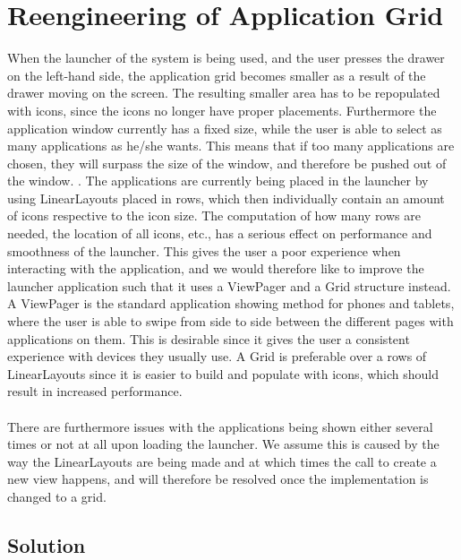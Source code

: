 
\section{Reengineering of Application Grid}
\label{sec:reengineering_of_application_grid}

When the launcher of the \giraf system is being used, and the user presses the drawer on the left-hand side, the application grid becomes smaller as a result of the drawer moving on the screen. The resulting smaller area has to be repopulated with icons, since the icons no longer have proper placements. Furthermore the application window currently has a fixed size, while the user is able to select as many applications as he/she wants. This means that if too many applications are chosen, they will surpass the size of the window, and therefore be pushed out of the window.
.
The applications are currently being placed in the launcher by using LinearLayouts placed in rows, which then individually contain an amount of icons respective to the icon size. The computation of how many rows are needed, the location of all icons, etc., has a serious effect on performance and smoothness of the launcher. This gives the user a poor experience when interacting with the application, and we would therefore like to improve the launcher application such that it uses a ViewPager and a Grid structure instead. A ViewPager is the standard application showing method for phones and tablets, where the user is able to swipe from side to side between the different pages with applications on them. This is desirable since it gives the user a consistent experience with devices they usually use. A Grid is preferable over a rows of LinearLayouts since it is easier to build and populate with icons, which should result in increased performance. 
\\\\
There are furthermore issues with the applications being shown either several times or not at all upon loading the launcher. We assume this is caused by the way the LinearLayouts are being made and at which times the call to create a new view happens, and will therefore be resolved once the implementation is changed to a grid. 

\subsection{Solution}
\label{sub:reengineering_of_application_grid_solution}

